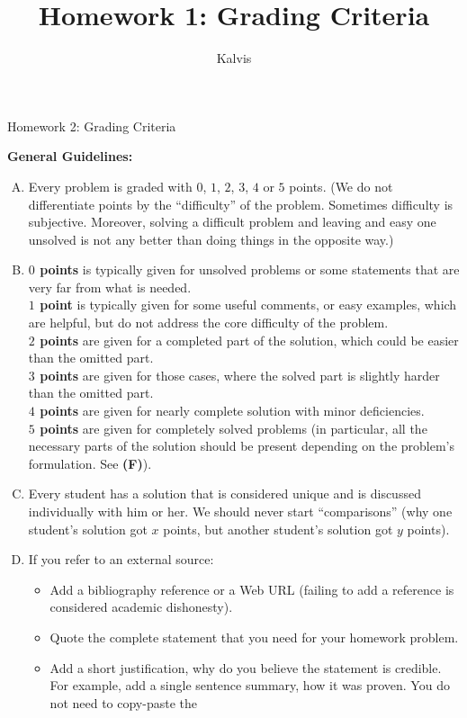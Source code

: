 \documentclass[jou]{apa6}
\title{Homework 1: Grading Criteria}
\author{Kalvis}
\affiliation{RBS}
\begin{document}
\thispagestyle{empty}

\twocolumn
{\Large Homework 2: Grading Criteria}


\vspace{2ex}
{\bf General Guidelines:}

\begin{enumerate}[(A)]
\item Every problem is graded with $0$, $1$, $2$, $3$, $4$ or $5$ points.
(We do not differentiate points by the ``difficulty'' of the problem. 
Sometimes difficulty is subjective. Moreover, 
solving a difficult problem and leaving and easy one unsolved is not any better
than doing things in the opposite way.)
\item  {\bf $0$ points} is typically given for unsolved problems or some statements that are very far from 
what is needed.\\
{\bf $1$ point} is typically given for some useful comments, or easy examples, which 
are helpful, but do not address the core difficulty of the problem.\\
{\bf $2$ points} are given for a completed part of the solution, which could be easier
than the omitted part.\\
{\bf $3$ points} are given for those cases, where the solved part is slightly harder than 
the omitted part.\\
{\bf $4$ points} are given for nearly complete solution with minor deficiencies.\\
{\bf $5$ points} are given for completely solved problems (in particular, all the necessary 
parts of the solution should be present \textendash{} depending on the problem's formulation. See {\bf (F)}).
\item Every student has a solution that is considered unique and is discussed individually with him or her.
We should never start ``comparisons'' (why one student's solution got $x$ points, but another 
student's solution got $y$ points).
\item If you refer to an external source:
\begin{itemize}
\item Add a bibliography reference or a Web URL (failing to add a reference is considered academic dishonesty).
\item Quote the complete statement that you need for your homework problem.
\item Add a short justification, why do you 
believe the statement is credible. For example, add a single sentence 
summary, how it was proven. You do not need to copy-paste the

\end{itemize}
\end{enumerate}
\end{document}

